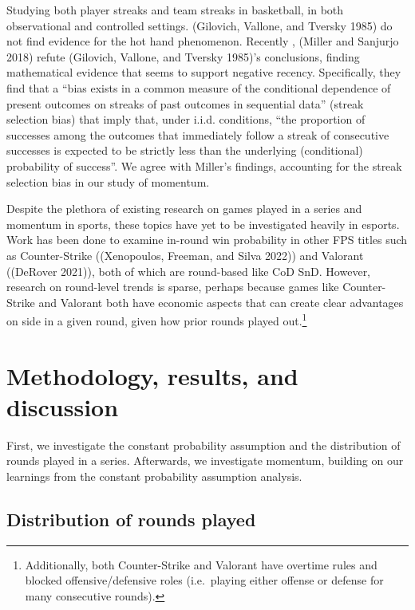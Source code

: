 \documentclass[
]{article}
\begin{document}
Studying both player streaks and team streaks in basketball, in both
observational and controlled settings. (Gilovich, Vallone, and Tversky
1985) do not find evidence for the hot hand phenomenon. Recently ,
(Miller and Sanjurjo 2018) refute (Gilovich, Vallone, and Tversky
1985)'s conclusions, finding mathematical evidence that seems to support
negative recency. Specifically, they find that a ``bias exists in a
common measure of the conditional dependence of present outcomes on
streaks of past outcomes in sequential data'' (streak selection bias)
that imply that, under i.i.d. conditions, ``the proportion of successes
among the outcomes that immediately follow a streak of consecutive
successes is expected to be strictly less than the underlying
(conditional) probability of success''. We agree with Miller's findings,
accounting for the streak selection bias in our study of momentum.

Despite the plethora of existing research on games played in a series
and momentum in sports, these topics have yet to be investigated heavily
in esports. Work has been done to examine in-round win probability in
other FPS titles such as Counter-Strike ((Xenopoulos, Freeman, and Silva
2022)) and Valorant ((DeRover 2021)), both of which are round-based like
CoD SnD. However, research on round-level trends is sparse, perhaps
because games like Counter-Strike and Valorant both have economic
aspects that can create clear advantages on side in a given round, given
how prior rounds played out.\footnote{Additionally, both Counter-Strike
  and Valorant have overtime rules and blocked offensive/defensive roles
  (i.e.~playing either offense or defense for many consecutive rounds).}

\hypertarget{methodology-results-and-discussion}{%
\section{Methodology, results, and
discussion}\label{methodology-results-and-discussion}}

First, we investigate the constant probability assumption and the
distribution of rounds played in a series. Afterwards, we investigate
momentum, building on our learnings from the constant probability
assumption analysis.

\hypertarget{distribution-of-rounds-played}{%
\subsection{Distribution of rounds
played}\label{distribution-of-rounds-played}}
\end{document}
